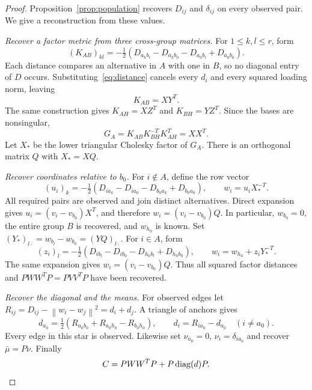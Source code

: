 \documentclass[11pt]{amsart}
\theoremstyle{definition}\newtheorem{example}[theorem]{Example}
\theoremstyle{remark}\newtheorem{remark}[theorem]{Remark}
\newcommand{\norm}[1]{\left\lVert#1\right\rVert}
\begin{document}
\begin{proof}
Proposition~\ref{prop:population} recovers $D_{ij}$ and $\delta_{ij}$ on every observed pair. We give a reconstruction from these values.

\emph{Recover a factor metric from three cross-group matrices.}
For $1\leq k,l\leq r$, form
\begin{equation}\label{eq:cross}
 (K_{AB})_{kl}=-\tfrac12
 (D_{a_kb_l}-D_{a_kb_0}-D_{a_0b_l}+D_{a_0b_0}).
\end{equation}
Each distance compares an alternative in $A$ with one in $B$, so no diagonal entry of $D$ occurs. Substituting~\eqref{eq:distance} cancels every $d_i$ and every squared loading norm, leaving
\[
 K_{AB}=XY^T.
\]
The same construction gives $K_{AH}=XZ^T$ and $K_{BH}=YZ^T$. Since the bases are nonsingular,
\begin{equation}\label{eq:metric}
 G_A=K_{AB}K_{BH}^{-T}K_{AH}^T=XX^T.
\end{equation}
Let $X_*$ be the lower triangular Cholesky factor of $G_A$. There is an orthogonal matrix $Q$ with $X_*=XQ$.

\emph{Recover coordinates relative to $b_0$.}
For $i\notin A$, define the row vector
\begin{equation}\label{eq:outside}
 (u_i)_k=-\tfrac12
 (D_{ia_k}-D_{ia_0}-D_{b_0a_k}+D_{b_0a_0}),\qquad
 w_i=u_iX_*^{-T}.
\end{equation}
All required pairs are observed and join distinct alternatives. Direct expansion gives $u_i=(v_i-v_{b_0})X^T$, and therefore $w_i=(v_i-v_{b_0})Q$. In particular, $w_{b_0}=0$, the entire group $B$ is recovered, and $w_{h_0}$ is known. Set $(Y_*)_{l\cdot}=w_{b_l}-w_{b_0}= (YQ)_{l\cdot}$. For $i\in A$, form
\begin{equation}\label{eq:inside}
 (z_i)_l=-\tfrac12
 (D_{ib_l}-D_{ib_0}-D_{h_0b_l}+D_{h_0b_0}),\qquad
 w_i=w_{h_0}+z_iY_*^{-T}.
\end{equation}
The same expansion gives $w_i=(v_i-v_{b_0})Q$. Thus all squared factor distances and $PWW^TP=PVV^TP$ have been recovered.

\emph{Recover the diagonal and the means.}
For observed edges let $R_{ij}=D_{ij}-\norm{w_i-w_j}^2=d_i+d_j$. A triangle of anchors gives
\begin{equation}\label{eq:diagonal}
 d_{a_0}=\tfrac12(R_{a_0b_0}+R_{a_0h_0}-R_{b_0h_0}),\qquad
 d_i=R_{ia_0}-d_{a_0}\quad(i\ne a_0).
\end{equation}
Every edge in this star is observed. Likewise set $\nu_{a_0}=0$, $\nu_i=\delta_{ia_0}$ and recover $\bar\mu=P\nu$. Finally
\[
 C=PWW^TP+P\operatorname{diag}(d)P.
\]


\end{proof}
\end{document}
